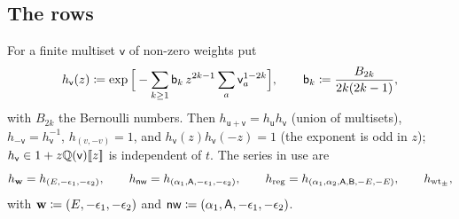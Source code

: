 \subsection{The rows}
\label{sec:set-rows}

For a finite multiset $\mathsf{v}$ of non-zero weights put
\begin{equation}
\label{eq:set-h}
h_{\mathsf{v}}(z)\coloneqq\exp\Big[-\sum_{k\geq1}\mathsf{b}_k\,z^{2k-1}\sum_{a}\mathsf{v}_a^{1-2k}\Big],\qquad \mathsf{b}_k\coloneqq\frac{B_{2k}}{2k(2k-1)},
\end{equation}
with $B_{2k}$ the Bernoulli numbers. Then $h_{\mathsf{u}+\mathsf{v}}=h_{\mathsf{u}}h_{\mathsf{v}}$ (union of multisets), $h_{-\mathsf{v}}=h_{\mathsf{v}}^{-1}$, $h_{(v,-v)}=1$, and $h_{\mathsf{v}}(z)h_{\mathsf{v}}(-z)=1$ (the exponent is odd in $z$); $h_{\mathsf{v}}\in1+z\mathbb{Q}(\mathsf{v})[\![ z ]\!]$ is independent of $t$. The series in use are
\[
h_{\mathbf{w}}=h_{(E,-\epsilon_1,-\epsilon_2)},\qquad h_{\mathsf{nw}}=h_{(\alpha_1,\mathsf{A},-\epsilon_1,-\epsilon_2)},\qquad h_{\mathrm{reg}}=h_{(\alpha_1,\alpha_2,\mathsf{A},\mathsf{B},-E,-E)},\qquad h_{\mathrm{wt}_\pm},
\]
with $\mathbf{w}\coloneqq(E,-\epsilon_1,-\epsilon_2)$ and $\mathsf{nw}\coloneqq(\alpha_1,\mathsf{A},-\epsilon_1,-\epsilon_2)$.

